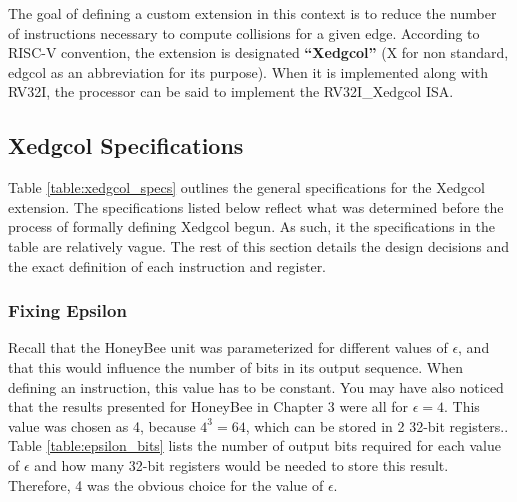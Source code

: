 
The goal of defining a custom extension in this context is to reduce the number of instructions necessary to compute collisions for a given edge. According to RISC-V convention, the extension is designated \textbf{``Xedgcol''} (X for non standard, edgcol as an abbreviation for its purpose). When it is implemented along with RV32I, the processor can be said to implement the RV32I\_Xedgcol ISA.

\subsection{Xedgcol Specifications}
    Table \ref{table:xedgcol_specs} outlines the general specifications for the Xedgcol extension. The specifications listed below reflect what was determined before the process of formally defining Xedgcol begun. As such, it the specifications in the table are relatively vague. The rest of this section details the design decisions and the exact definition of each instruction and register.

    

    \subsubsection{Fixing Epsilon}
        Recall that the HoneyBee unit was parameterized for different values of $\epsilon$, and that this would influence the number of bits in its output sequence. When defining an instruction, this value has to be constant. You may have also noticed that the results presented for HoneyBee in Chapter 3 were all for $\epsilon = 4$. This value was chosen as 4, because $4^3 = 64$, which can be stored in 2 32-bit registers.. Table \ref{table:epsilon_bits} lists the number of output bits required for each value of $\epsilon$ and how many 32-bit registers would be needed to store this result. Therefore, 4 was the obvious choice for the value of $\epsilon$.

    


